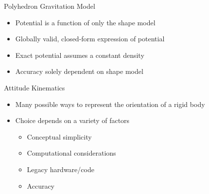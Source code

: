 
\begin{frame}[noframenumbering]{Polyhedron Gravitation Model}
\label{slide:polyhedron_gravity}
\begin{itemize}
    \item Potential is a function of only the shape model
    \item Globally valid, closed-form expression of potential
    \item Exact potential assumes a constant density 
    \item Accuracy solely dependent on shape model
\end{itemize}

\end{frame}

\begin{frame}[noframenumbering]{Attitude Kinematics}
\label{slide:attitude_kinematics}
\begin{itemize}
    \item Many possible ways to represent the orientation of a rigid body
    \item Choice depends on a variety of factors
    \begin{itemize}
        \item Conceptual simplicity
        \item Computational considerations
        \item Legacy hardware/code
        \item Accuracy
    \end{itemize}
\end{itemize}
\end{frame}

